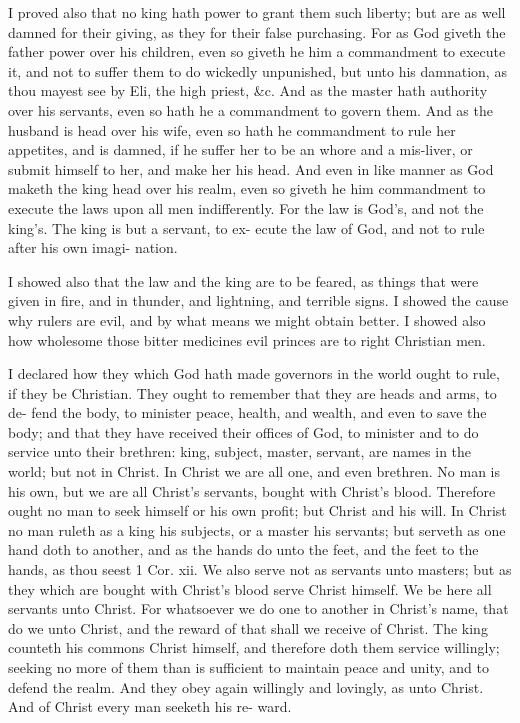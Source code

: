 \documentclass{custom}
\begin{document}
I proved also that no king hath power to grant them 
such liberty; but are as well damned for their giving, as 
they for their false purchasing. For as God giveth the 
father power over his children, even so giveth he him a 
commandment to execute it, and not to suffer them to do 
wickedly unpunished, but unto his damnation, as thou mayest 
see by Eli, the high priest, &c. And as the master hath 
authority over his servants, even so hath he a commandment 
to govern them. And as the husband is head over his wife, 
even so hath he commandment to rule her appetites, and is 
damned, if he suffer her to be an whore and a mis-liver, 
or submit himself to her, and make her his head. And
even in like manner as God maketh the king head over his
realm, even so giveth he him commandment to execute
the laws upon all men indifferently. For the law is God's,
and not the king's. The king is but a servant, to ex- 
ecute the law of God, and not to rule after his own imagi- 
nation. 

I showed also that the law and the king are to be 
feared, as things that were given in fire, and in thunder, 
and lightning, and terrible signs. I showed the cause why 
rulers are evil, and by what means we might obtain better. 
I showed also how wholesome those bitter medicines evil 
princes are to right Christian men. 

I declared how they which God hath made governors in 
the world ought to rule, if they be Christian. They 
ought to remember that they are heads and arms, to de- 
fend the body, to minister peace, health, and wealth, and 
even to save the body; and that they have received their 
offices of God, to minister and to do service unto their 
brethren: king, subject, master, servant, are names in the 
world; but not in Christ. In Christ we are all one, and 
even brethren. No man is his own, but we are all 
Christ's servants, bought with Christ's blood. Therefore 
ought no man to seek himself or his own profit; but 
Christ and his will. In Christ no man ruleth as a king 
his subjects, or a master his servants; but serveth as one 
hand doth to another, and as the hands do unto the feet, 
and the feet to the hands, as thou seest 1 Cor. xii. We 
also serve not as servants unto masters; but as they which 
are bought with Christ's blood serve Christ himself. We 
be here all servants unto Christ. For whatsoever we do 
one to another in Christ's name, that do we unto Christ, 
and the reward of that shall we receive of Christ. The 
king counteth his commons Christ himself, and therefore 
doth them service willingly; seeking no more of them than 
is sufficient to maintain peace and unity, and to defend the 
realm. And they obey again willingly and lovingly, as 
unto Christ. And of Christ every man seeketh his re- 
ward. 
\end{document}
